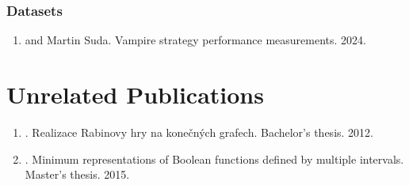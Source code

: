 
\subsubsection{Datasets}

\begin{enumerate}
\item {} and Martin Suda.
Vampire strategy performance measurements.
2024.
\cite{bartek10814478}
\end{enumerate}

\section{Unrelated Publications}

\begin{enumerate}
\item {}. \foreignlanguage{czech}{Realizace Rabinovy hry na konečných grafech}. Bachelor's thesis. 2012. \cite{Bartek2012thesis}
\item {}. Minimum representations of Boolean functions defined by multiple intervals. Master's thesis. 2015. \cite{bartek2015}
\end{enumerate}

